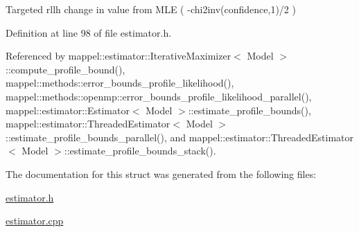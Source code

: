 Targeted rllh change in value from M\+LE ( -\/chi2inv(confidence,1)/2 ) 



Definition at line 98 of file estimator.\+h.



Referenced by mappel\+::estimator\+::\+Iterative\+Maximizer$<$ Model $>$\+::compute\+\_\+profile\+\_\+bound(), mappel\+::methods\+::error\+\_\+bounds\+\_\+profile\+\_\+likelihood(), mappel\+::methods\+::openmp\+::error\+\_\+bounds\+\_\+profile\+\_\+likelihood\+\_\+parallel(), mappel\+::estimator\+::\+Estimator$<$ Model $>$\+::estimate\+\_\+profile\+\_\+bounds(), mappel\+::estimator\+::\+Threaded\+Estimator$<$ Model $>$\+::estimate\+\_\+profile\+\_\+bounds\+\_\+parallel(), and mappel\+::estimator\+::\+Threaded\+Estimator$<$ Model $>$\+::estimate\+\_\+profile\+\_\+bounds\+\_\+stack().



The documentation for this struct was generated from the following files\+:\begin{DoxyCompactItemize}
\item 
\hyperlink{estimator_8h}{estimator.\+h}\item 
\hyperlink{estimator_8cpp}{estimator.\+cpp}\end{DoxyCompactItemize}
